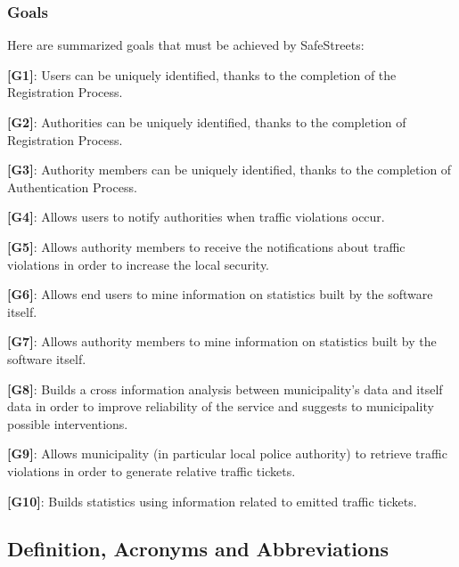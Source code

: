 \documentclass[12pt]{article}
\begin{document}
\subsubsection{Goals}
\vspace{5mm}
\begin{flushleft}
Here are summarized goals that must be achieved by SafeStreets:
\vspace{2mm}

\textbf{[G1]}: Users can be uniquely identified, thanks to the completion of the Registration Process.\vspace{1mm}

\textbf{[G2]}: Authorities can be uniquely identified, thanks to the completion of Registration Process.
\vspace{1mm}

\textbf{[G3]}: Authority members can be uniquely identified, thanks to the completion of Authentication Process.
\vspace{1mm}

\textbf{[G4]}: Allows users to notify authorities when traffic violations occur.
\vspace{1mm}

\textbf{[G5]}: Allows authority members to receive the notifications about traffic violations in order to increase the local security.
\vspace{1mm}

\textbf{[G6]}:  Allows end users to mine information on statistics built by the software itself.
\vspace{1mm}

\textbf{[G7]}: Allows authority members to mine information on statistics built by the software itself. \vspace{1mm}

\textbf{[G8]}: Builds a cross information analysis between municipality’s data and itself data in order to improve reliability of the service and suggests to municipality possible interventions. \vspace{1mm}

\textbf{[G9]}: Allows municipality (in particular local police authority) to retrieve traffic violations in order to generate relative traffic tickets.\vspace{1mm}

\textbf{[G10]}: Builds statistics using information related to emitted traffic tickets.
\end{flushleft}
\vspace{5mm}
\subsection{Definition, Acronyms and Abbreviations}
\vspace{5mm}
\end{document}
